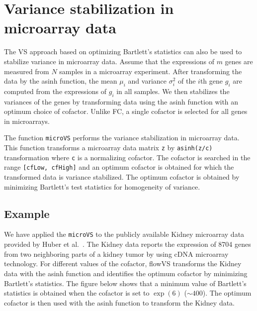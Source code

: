 \documentclass{article}\usepackage[]{graphicx}\usepackage[]{color}
\begin{document}
\section{Variance stabilization in microarray data}
The VS approach based on optimizing Bartlett's statistics can also be used to stabilize variance in microarray data.  
Assume that the expressions of $m$ genes are measured from $N$ samples in a microarray experiment. 
After transforming the data by the asinh function, the mean $\mu_i$ and variance $\sigma^2_i$ of the $i$th gene $g_i$ are computed from the expressions of $g_i$ in all samples.  
We then stabilizes the variances of the genes by transforming data using the asinh function with an optimum choice of cofactor.
Unlike FC, a single cofactor is selected for all genes in microarrays.

The function \texttt{microVS} performs the variance stabilization in microarray data.
This function transforms a microarray data matrix \texttt{z} by \texttt{asinh(z/c)} transformation where \texttt{c} is a normalizing cofactor.
The cofactor is searched in the range \texttt{[cfLow, cfHigh]} and an optimum cofactor is obtained for which the transformed data is variance stabilized.
The optimum cofactor is obtained by minimizing Bartlett's test statistics for homogeneity of variance.

\subsection{Example}
We have applied the \texttt{microVS} to the publicly available Kidney microarray data provided by Huber et al.~\cite{huber2002variance}.
The Kidney data reports the expression of 8704 genes from two neighboring parts of a kidney tumor by using cDNA microarray technology. 
For different values of the cofactor, flowVS transforms the Kidney data with the asinh function and identifies the optimum cofactor by minimizing Bartlett's statistics.
The figure below shows that a minimum value of Bartlett's statistics is obtained when the cofactor is set to $\exp(6)$ ($\sim400$). 
The optimum cofactor is then used with the asinh function to transform the Kidney data.
\end{document}
